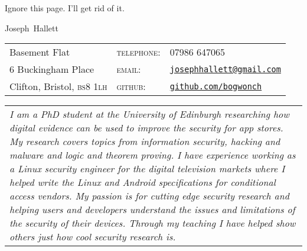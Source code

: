 \documentclass[a4paper,10pt,selectp]{book}
\newcommand{\lowercaps}[1]{\textsc{\MakeLowercase{#1}}}
\newcommand{\heading}[1]{{{\color{BrickRed}\hspace{1em}\Huge #1}\vspace{0.5em}}}
\newcommand{\email}[1]{\href{mailto:#1}{#1}}
\newcommand{\postcode}[1]{\lowercaps{#1}}
\begin{document}
Ignore this page.  I'll get rid of it.
\newpage

\heading{Joseph~Hallett}

\begin{tabular}{l@{\hspace{12em}} l@{\hspace{1em}} l}
Basement Flat & \textsc{telephone:} & 07986 647065 \\
6 Buckingham Place & \textsc{email:} & \email{\tt josephhallett@gmail.com} \\
Clifton, Bristol, \postcode{bs8 1lh} & \textsc{github:} & \href{https://www.github.com/bogwonch}{\tt github.com/bogwonch} \\
\end{tabular}

\vspace{1em}
\begin{tabular}{p{\textwidth}}\itshape
  I am a PhD student at the University of Edinburgh researching how digital
  evidence can be used to improve the security for app stores.  My research
  covers topics from information security, hacking and malware and logic and
  theorem proving.  I have experience working as a Linux security engineer for
  the digital television markets where I helped write the Linux and Android
  specifications for conditional access vendors.  My passion is for cutting
  edge security research and helping users and developers understand the issues
  and limitations of the security of their devices. Through my teaching I have
  helped show others just how cool security research is.
\end{tabular}
\vspace{0.3em}
\end{document}
